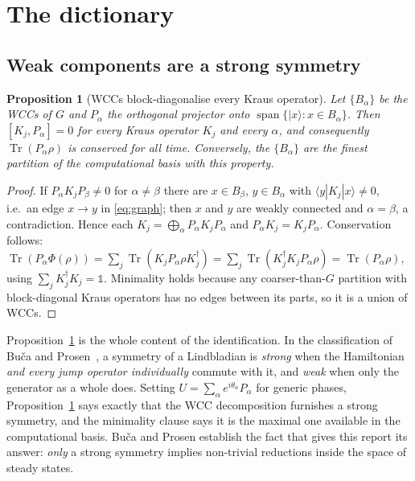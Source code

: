 \documentclass[11pt]{article}
\newcommand{\Tr}{\operatorname{Tr}}
\theoremstyle{plain}
\newtheorem{proposition}{Proposition}
\theoremstyle{definition}
\theoremstyle{remark}
\begin{document}
\section{The dictionary}
\label{sec:dictionary}

\subsection{Weak components are a strong symmetry}

\begin{proposition}[WCCs block-diagonalise every Kraus operator]
\label{prop:wcc}
Let $\{B_\alpha\}$ be the WCCs of $G$ and $P_\alpha$ the orthogonal projector
onto $\operatorname{span}\{|x\rangle : x \in B_\alpha\}$. Then
$[K_j, P_\alpha] = 0$ for every Kraus operator $K_j$ and every $\alpha$, and
consequently $\Tr(P_\alpha \rho)$ is conserved for all time. Conversely, the
$\{B_\alpha\}$ are the \emph{finest} partition of the computational basis with
this property.
\end{proposition}

\begin{proof}
If $P_\alpha K_j P_\beta \neq 0$ for $\alpha \neq \beta$ there are
$x \in B_\beta$, $y \in B_\alpha$ with $\langle y|K_j|x\rangle \neq 0$, i.e.\ an
edge $x \to y$ in \eqref{eq:graph}; then $x$ and $y$ are weakly connected and
$\alpha = \beta$, a contradiction. Hence each $K_j = \bigoplus_\alpha P_\alpha
K_j P_\alpha$ and $P_\alpha K_j = K_j P_\alpha$. Conservation follows:
$\Tr(P_\alpha \Phi(\rho)) = \sum_j \Tr(K_j P_\alpha \rho K_j^\dagger) =
\sum_j \Tr(K_j^\dagger K_j P_\alpha \rho) = \Tr(P_\alpha\rho)$, using
$\sum_j K_j^\dagger K_j = \mathbb{1}$. Minimality holds because any coarser-than-$G$
partition with block-diagonal Kraus operators has no edges between its parts,
so it is a union of WCCs.
\end{proof}

Proposition~\ref{prop:wcc} is the whole content of the identification. In the
classification of Bu\v{c}a and Prosen~\cite{buca2012}, a symmetry of a
Lindbladian is \emph{strong} when the Hamiltonian \emph{and every jump
operator individually} commute with it, and \emph{weak} when only the
generator as a whole does. Setting $U = \sum_\alpha e^{i\theta_\alpha}
P_\alpha$ for generic phases, Proposition~\ref{prop:wcc} says exactly that the
WCC decomposition furnishes a strong symmetry, and the minimality clause says
it is the maximal one available in the computational basis. Bu\v{c}a and Prosen
establish the fact that gives this report its answer: \emph{only} a strong
symmetry implies non-trivial reductions inside the space of steady states.
\end{document}
